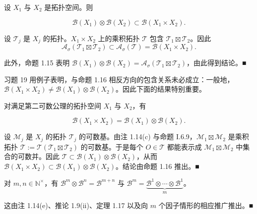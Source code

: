 \begin{proposition}

设 $ X_1 $ 与 $ X_2 $ 是拓扑空间。则

\[
\mathcal{B}(X_1) \otimes \mathcal{B}(X_2) \subset \mathcal{B}(X_1 \times X_2) .
\]

\proofhead
设 $ \mathcal{T}_j $ 是 $ X_j $ 的拓扑。$ X_1 \times X_2 $ 上的乘积拓扑 $ \mathcal{T} $ 包含 $ \mathcal{T}_1 \boxtimes \mathcal{T}_2 $。因此
\[
\mathcal{A}_\sigma(\mathcal{T}_1 \boxtimes \mathcal{T}_2) \subset \mathcal{A}_\sigma(\mathcal{T}) = \mathcal{B}(X_1 \times X_2) .
\]

此外，命题 1.15 表明 $ \mathcal{B}(X_1) \otimes \mathcal{B}(X_2) = \mathcal{A}_\sigma(\mathcal{T}_1 \boxtimes \mathcal{T}_2) $，由此得到结论。\nobreak\hspace{0.35em}■

\end{proposition}

习题 19 用例子表明，与命题 1.16 相反方向的包含关系未必成立：一般地，$ \mathcal{B}(X_1 \times X_2) \neq \mathcal{B}(X_1) \otimes \mathcal{B}(X_2) $。因此下面的结果特别重要。

\begin{theorem}

对满足第二可数公理的拓扑空间 $ X_1 $ 与 $ X_2 $，有

\[
\mathcal{B}(X_1 \times X_2) = \mathcal{B}(X_1) \otimes \mathcal{B}(X_2) .
\]

\proofhead
设 $ \mathcal{M}_j $ 是 $ X_j $ 的拓扑 $ \mathcal{T}_j $ 的可数基。由注 1.14(c) 与命题 I.6.9，$ \mathcal{M}_1 \boxtimes \mathcal{M}_2 $ 是乘积拓扑 $ \mathcal{T} := \mathcal{T}(\mathcal{T}_1 \boxtimes \mathcal{T}_2) $ 的可数基。于是每个 $ O \in \mathcal{T} $ 都能表示成 $ \mathcal{M}_1 \boxtimes \mathcal{M}_2 $ 中集合的可数并。因此 $ \mathcal{T} \subset \mathcal{B}(X_1) \otimes \mathcal{B}(X_2) $，从而 $ \mathcal{B}(X_1 \times X_2) \subset \mathcal{B}(X_1) \otimes \mathcal{B}(X_2) $。结论由命题 1.16 推出。\nobreak\hspace{0.35em}■
\end{theorem}

\begin{corollary}

对 $ m, n \in \mathbb{N}^\times $，有 $ \mathcal{B}^m \otimes \mathcal{B}^n = \mathcal{B}^{m+n} $ 与 $ \mathcal{B}^m = \underbrace{\mathcal{B}^1 \otimes \cdots \otimes \mathcal{B}^1}_{m} $。

\proofhead
这由注 1.14(e)、推论 1.9(ii)、定理 1.17 以及向 $ m $ 个因子情形的相应推广推出。\nobreak\hspace{0.35em}■
\end{corollary}

